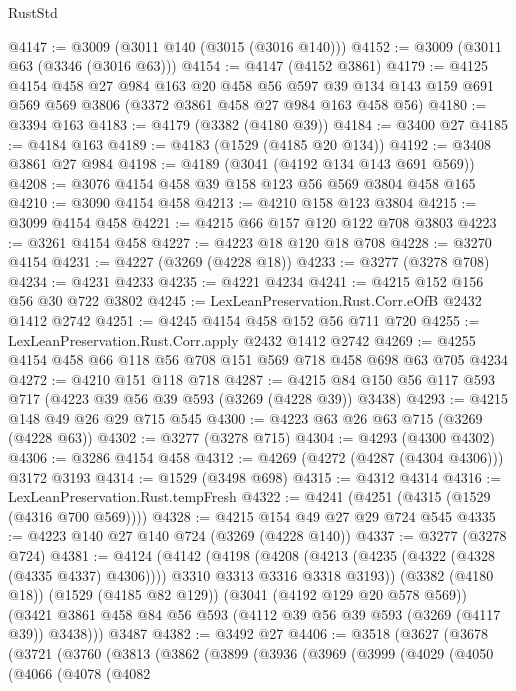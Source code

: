 \begin{lexlean}{RustStd}
\begin{coremodule}
@4147 := @3009 (@3011 @140 (@3015 (@3016 @140)))
@4152 := @3009 (@3011 @63 (@3346 (@3016 @63)))
@4154 := @4147 (@4152 @3861)
@4179 := @4125
    @4154
    @458
    @27
    @984
    @163
    @20
    @458
    @56
    @597
    @39
    @134
    @143
    @159
    @691
    @569
    @569
    @3806
    (@3372 @3861 @458 @27 @984 @163 @458 @56)
@4180 := @3394 @163
@4183 := @4179 (@3382 (@4180 @39))
@4184 := @3400 @27
@4185 := @4184 @163
@4189 := @4183 (@1529 (@4185 @20 @134))
@4192 := @3408 @3861 @27 @984
@4198 := @4189 (@3041 (@4192 @134 @143 @691 @569))
@4208 := @3076 @4154 @458 @39 @158 @123 @56 @569 @3804 @458 @165
@4210 := @3090 @4154 @458
@4213 := @4210 @158 @123 @3804
@4215 := @3099 @4154 @458
@4221 := @4215 @66 @157 @120 @122 @708 @3803
@4223 := @3261 @4154 @458
@4227 := @4223 @18 @120 @18 @708
@4228 := @3270 @4154
@4231 := @4227 (@3269 (@4228 @18))
@4233 := @3277 (@3278 @708)
@4234 := @4231 @4233
@4235 := @4221 @4234
@4241 := @4215 @152 @156 @56 @30 @722 @3802
@4245 := LexLeanPreservation.Rust.Corr.eOfB @2432 @1412 @2742
@4251 := @4245 @4154 @458 @152 @56 @711 @720
@4255 := LexLeanPreservation.Rust.Corr.apply @2432 @1412 @2742
@4269 := @4255 @4154 @458 @66 @118 @56 @708 @151 @569 @718 @458 @698 @63 @705 @4234
@4272 := @4210 @151 @118 @718
@4287 := @4215 @84 @150 @56 @117 @593 @717 (@4223 @39 @56 @39 @593 (@3269 (@4228 @39)) @3438)
@4293 := @4215 @148 @49 @26 @29 @715 @545
@4300 := @4223 @63 @26 @63 @715 (@3269 (@4228 @63))
@4302 := @3277 (@3278 @715)
@4304 := @4293 (@4300 @4302)
@4306 := @3286 @4154 @458
@4312 := @4269 (@4272 (@4287 (@4304 @4306))) @3172 @3193
@4314 := @1529 (@3498 @698)
@4315 := @4312 @4314
@4316 := LexLeanPreservation.Rust.tempFresh
@4322 := @4241 (@4251 (@4315 (@1529 (@4316 @700 @569))))
@4328 := @4215 @154 @49 @27 @29 @724 @545
@4335 := @4223 @140 @27 @140 @724 (@3269 (@4228 @140))
@4337 := @3277 (@3278 @724)
@4381 := @4124
    (@4142
      (@4198
        (@4208 (@4213 (@4235 (@4322 (@4328 (@4335 @4337) @4306)))) @3310 @3313 @3316 @3318 @3193))
      (@3382 (@4180 @18))
      (@1529 (@4185 @82 @129))
      (@3041 (@4192 @129 @20 @578 @569))
      (@3421 @3861 @458 @84 @56 @593 (@4112 @39 @56 @39 @593 (@3269 (@4117 @39)) @3438)))
    @3487
@4382 := @3492 @27
@4406 := @3518
    (@3627
      (@3678
        (@3721
          (@3760
            (@3813
              (@3862
                (@3899
                  (@3936
                    (@3969
                      (@3999
                        (@4029
                          (@4050
                            (@4066
                              (@4078
                                (@4082

\end{coremodule}
\end{lexlean}
